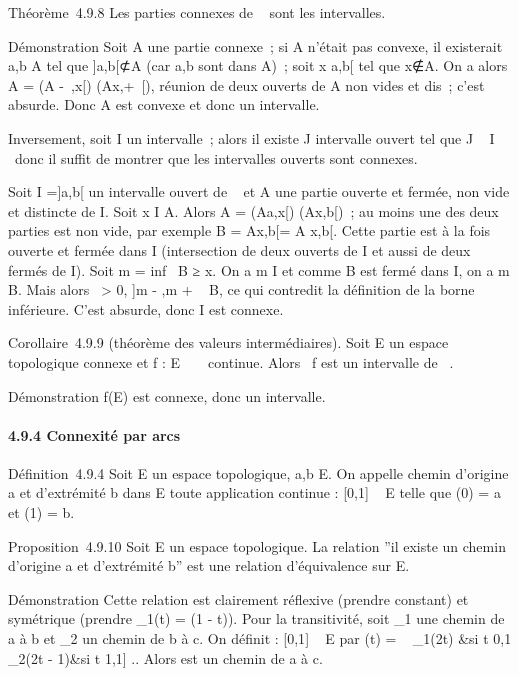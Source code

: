 \documentclass[]{article}
\begin{document}
Théorème~4.9.8 Les parties connexes de ~ sont les intervalles.

Démonstration Soit A une partie connexe~; si A n'était pas convexe, il
existerait a,b \in A tel que {]}a,b{[}⊄A (car a,b sont dans A)~; soit x
\in{]}a,b{[} tel que x∉A. On a alors A = (A\bigcap{]}
-\infty~,x{[}) \cup (A\bigcap{]}x,+\infty~{[}), réunion de deux ouverts de A non vides et
dis\jmathoints~; c'est absurde. Donc A est convexe et donc un intervalle.

Inversement, soit I un intervalle~; alors il existe J intervalle ouvert
tel que J \subset~ I \subset~\overlineJ donc il suffit de montrer
que les intervalles ouverts sont connexes.

Soit I ={]}a,b{[} un intervalle ouvert de ~ et A une partie ouverte et
fermée, non vide et distincte de I. Soit x \in I \diagdown A. Alors A =
(A\bigcap{]}a,x{[}) \cup (A\bigcap{]}x,b{[})~; au moins une des deux parties est non
vide, par exemple B = A\bigcap{]}x,b{[}= A \bigcap {[}x,b{[}. Cette partie est à la
fois ouverte et fermée dans I (intersection de deux ouverts de I et
aussi de deux fermés de I). Soit m = inf~ B ≥
x. On a m \in I et comme B est fermé dans I, on a m \in B. Mais alors
\exists~\epsilon \textgreater{} 0, {]}m - \epsilon,m + \epsilon{[}\subset~ B, ce
qui contredit la définition de la borne inférieure. C'est absurde, donc
I est connexe.

Corollaire~4.9.9 (théorème des valeurs intermédiaires). Soit E un espace
topologique connexe et f : E \rightarrow~ ~ continue. Alors
\mathrmIm~f est un
intervalle de ~.

Démonstration f(E) est connexe, donc un intervalle.

\paragraph{4.9.4 Connexité par arcs}

Définition~4.9.4 Soit E un espace topologique, a,b \in E. On appelle
chemin d'origine a et d'extrémité b dans E toute application continue \gamma
: {[}0,1{]} \rightarrow~ E telle que \gamma(0) = a et \gamma(1) = b.

Proposition~4.9.10 Soit E un espace topologique. La relation ''il existe
un chemin d'origine a et d'extrémité b'' est une relation d'équivalence
sur E.

Démonstration Cette relation est clairement réflexive (prendre \gamma
constant) et symétrique (prendre \gamma\_1(t) = \gamma(1 - t)). Pour la
transitivité, soit \gamma\_1 une chemin de a à b et \gamma\_2 un
chemin de b à c. On définit \gamma : {[}0,1{]} \rightarrow~ E par \gamma(t) =
\left \ \cases
\gamma\_1(2t) &si t \in {[}0,1\diagup2{]} \cr \gamma\_2(2t
- 1)&si t \in {[}1,1{]} \cr  \right ..
Alors \gamma est un chemin de a à c.
\end{document}
